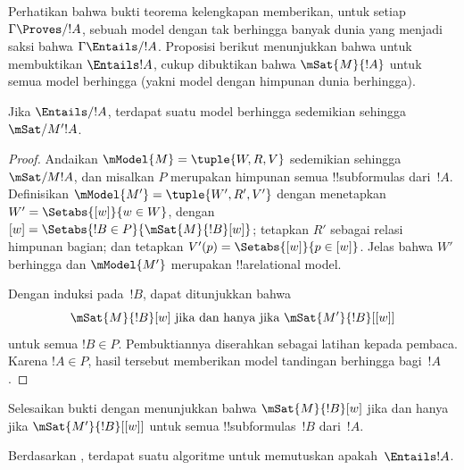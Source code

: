 \documentclass[../../../include/open-logic-section]{subfiles}
\begin{document}

Perhatikan bahwa bukti teorema kelengkapan memberikan, untuk setiap
$\Gamma\Proves/ !A$, sebuah model dengan tak berhingga banyak dunia yang
menjadi saksi bahwa $\Gamma\Entails/ !A$. Proposisi berikut menunjukkan bahwa
untuk membuktikan $\Entails !A$, cukup dibuktikan bahwa $\mSat{M}{!A}$ untuk
semua model berhingga (yakni model dengan himpunan dunia berhingga).

\begin{thm}
  Jika $\Entails/ !A$, terdapat suatu model berhingga sedemikian sehingga
  $\mSat/{M'}{!A}$.
\end{thm}

\begin{proof}
  Andaikan $\mModel{M}=\tuple{W,R,V}$ sedemikian sehingga
  $\mSat/{M}{!A}$, dan misalkan $P$ merupakan himpunan semua
  !!{subformula}s dari~$!A$. Definisikan
  $\mModel{M'}=\tuple{W',R',V'}$ dengan menetapkan
  $W'=\Setabs{[w]}{w\in W}$, dengan
  $[w]=\Setabs{!B\in P}{\mSat{M}{!B}[w]}$; tetapkan $R'$ sebagai relasi
  himpunan bagian; dan tetapkan
  $V'(p)=\Setabs{[w]}{p\in[w]}$. Jelas bahwa $W'$ berhingga dan
  $\mModel{M'}$ merupakan !!a{relational model}.

  Dengan induksi pada~$!B$, dapat ditunjukkan bahwa
  \[
    \mSat{M}{!B}[w] \text{ jika dan hanya jika }
    \mSat{M'}{!B}[{[w]}]
  \]
  untuk semua $!B\in P$. Pembuktiannya diserahkan sebagai latihan kepada
  pembaca. Karena $!A\in P$, hasil tersebut memberikan model tandingan
  berhingga bagi~$!A$.
\end{proof}

\begin{prob}
Selesaikan bukti  dengan menunjukkan
bahwa $\mSat{M}{!B}[w]$ jika dan hanya jika
$\mSat{M'}{!B}[{[w]}]$ untuk semua !!{subformula}s~$!B$ dari~$!A$.
\end{prob}

Berdasarkan , terdapat suatu algoritme untuk
memutuskan apakah~$\Entails !A$.
\end{document}
